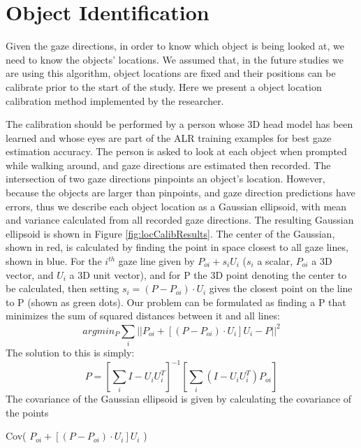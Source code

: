 \section{Object Identification}
Given the gaze directions, in order to know which object is being looked at, we need to know the objects' locations.  We assumed that, in the future studies we are using this algorithm, object locations are fixed and their positions can be calibrate prior to the start of the study.  Here we present a object location calibration method implemented by the researcher.

The calibration should be performed by a person whose 3D head model has been learned and whose eyes are part of the ALR training examples for best gaze estimation accuracy.  The person is asked to look at each object when prompted while walking around, and gaze directions are estimated then recorded.  The intersection of two gaze directions pinpoints an object's location.  However, because the objects are larger than pinpoints, and gaze direction predictions have errors, thus we describe each object location as a Gaussian ellipsoid, with mean and variance calculated from all recorded gaze directions.  The resulting Gaussian ellipsoid is shown in Figure \ref{fig:locCalibResults}.  The center of the Gaussian, shown in red, is calculated by finding the point in space closest to all gaze lines, shown in blue.  For the \(i^{th}\) gaze line given by \(P_{oi} + s_i U_i\) (\(s_i\) a scalar, \(P_{oi}\) a 3D vector, and \(U_i\) a 3D unit vector), and for P the 3D point denoting the center to be calculated, then setting \(s_i = (P - P_{oi})\cdot{U_i} \) gives the closest point on the line to P (shown as green dots).  Our problem can be formulated as finding a P that minimizes the sum of squared distances between it and all lines:
\[ argmin_P \sum_{i}^{} || P_{oi} + [(P - P_{oi})\cdot{U_i}]U_i - P ||^2 \]
The solution to this is simply:
\[ P = [ \sum_{i}^{} I - U_i U_i^T ]^{-1}  [ \sum_{i}^{}(I - U_i U_i^T)P_{oi} ]   \]
The covariance of the Gaussian ellipsoid is given by calculating the covariance of the points


 Cov( \(P_{oi} + [(P - P_{oi})\cdot{U_i}]U_i\) )
 
